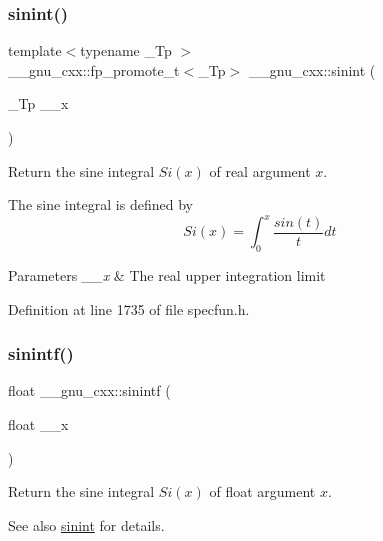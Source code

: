 \subsubsection{\texorpdfstring{sinint()}{sinint()}}
{\footnotesize\ttfamily template$<$typename \+\_\+\+Tp $>$ \\
\+\_\+\+\_\+gnu\+\_\+cxx\+::fp\+\_\+promote\+\_\+t$<$\+\_\+\+Tp$>$ \+\_\+\+\_\+gnu\+\_\+cxx\+::sinint (\begin{DoxyParamCaption}\item[{\+\_\+\+Tp}]{\+\_\+\+\_\+x }\end{DoxyParamCaption})\hspace{0.3cm}{\ttfamily [inline]}}

Return the sine integral $ Si(x) $ of real argument $ x $.

The sine integral is defined by \[ Si(x) = \int_0^x \frac{sin(t)}{t}dt \]


\begin{DoxyParams}{Parameters}
{\em \+\_\+\+\_\+x} & The real upper integration limit \\
\hline
\end{DoxyParams}


Definition at line 1735 of file specfun.\+h.

\mbox{\label{group__gnu__math__spec__func_ga8b63406fec50d7e00470521b82fb32a2}} 
\subsubsection{\texorpdfstring{sinintf()}{sinintf()}}
{\footnotesize\ttfamily float \+\_\+\+\_\+gnu\+\_\+cxx\+::sinintf (\begin{DoxyParamCaption}\item[{float}]{\+\_\+\+\_\+x }\end{DoxyParamCaption})\hspace{0.3cm}{\ttfamily [inline]}}

Return the sine integral $ Si(x) $ of {\ttfamily float} argument $ x $.

\begin{DoxySeeAlso}{See also}
\hyperlink{group__gnu__math__spec__func_ga076c8d52588904f5711c41781f8acfa0}{sinint} for details. 
\end{DoxySeeAlso}



